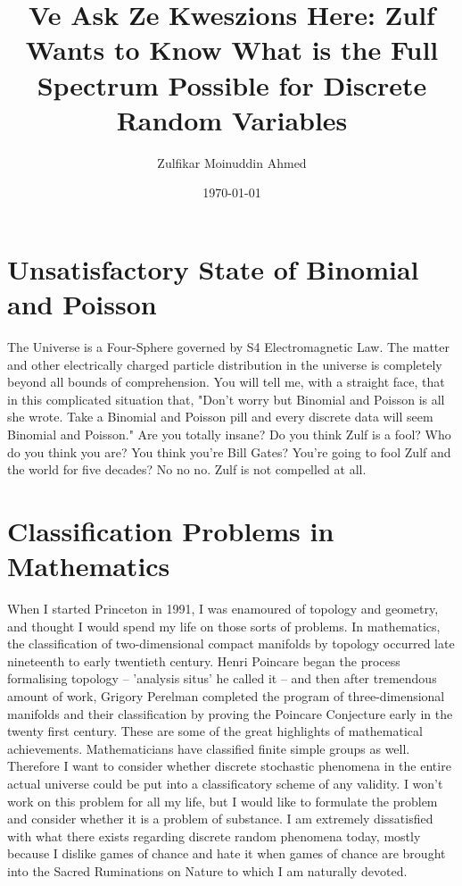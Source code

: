 \documentclass{amsart}
\title{Ve Ask Ze Kweszions Here: Zulf Wants to Know What is the Full Spectrum Possible for Discrete Random Variables}
\author{Zulfikar Moinuddin Ahmed}
\date{\today}
\begin{document}
\maketitle

\section{Unsatisfactory State of Binomial and Poisson}

The Universe is a Four-Sphere governed by S4 Electromagnetic Law.  The matter and other electrically charged particle distribution in the universe is completely beyond all bounds of comprehension.  You will tell me, with a straight face, that in this complicated situation that, "Don't worry but Binomial and Poisson is all she wrote.  Take a Binomial and Poisson pill and every discrete data will seem Binomial and Poisson."  Are you totally insane?  Do you think Zulf is a fool?  Who do you think you are?  You think you're Bill Gates?  You're going to fool Zulf and the world for five decades?  No no no.  Zulf is not compelled at all.

\section{Classification Problems in Mathematics}

When I started Princeton in 1991, I was enamoured of topology and geometry, and thought I would spend my life on those sorts of problems.  In mathematics, the classification of two-dimensional compact manifolds by topology occurred late nineteenth to early twentieth century.  Henri Poincare began the process formalising topology -- 'analysis situs' he called it -- and then after tremendous amount of work, Grigory Perelman completed the program of three-dimensional manifolds and their classification by proving the Poincare Conjecture early in the twenty first century.  These are some of the great highlights of mathematical achievements.  Mathematicians have classified finite simple groups as well.  Therefore I want to consider whether discrete stochastic phenomena in the entire actual universe could be put into a classificatory scheme of any validity.  I won't work on this problem for all my life, but I would like to formulate the problem and consider whether it is a problem of substance.  I am extremely dissatisfied with what there exists regarding discrete random phenomena today, mostly because I dislike games of chance and hate it when games of chance are brought into the Sacred Ruminations on Nature to which I am naturally devoted.
\end{document}
